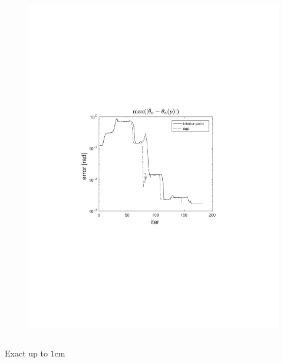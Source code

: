 \begin{frame}
\begin{columns}[t]
\begin{figure}
                \includegraphics[trim=4cm 9cm 4cm 8.5cm, clip=true, width=\linewidth]{img/convPlotT_1}
            \end{figure}
    \end{columns}

    \begin{center}
        Exact up to $1\text{cm}$
    \end{center}
\end{frame}
